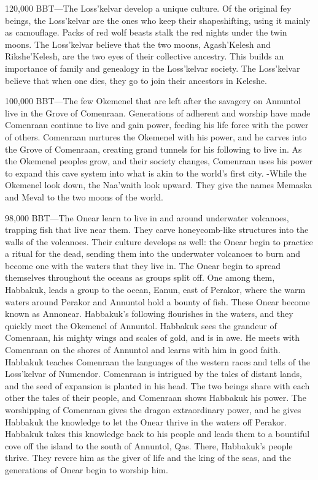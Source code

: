 \documentclass[smalldemyvopaper,11pt,twoside,onecolumn,openright,extrafontsizes]{memoir}
\begin{document}
{{120,000 BBT—The Loss’kelvar develop a unique culture. Of the original fey beings, the Loss’kelvar are the ones who keep their shapeshifting, using it mainly as camouflage. Packs of red wolf beasts stalk the red nights under the twin moons. The Loss’kelvar believe that the two moons, Agash’Kelesh and Rikshe’Kelesh, are the two eyes of their collective ancestry. This builds an importance of family and genealogy in the Loss’kelvar society. The Loss’kelvar believe that when one dies, they go to join their ancestors in Keleshe.

100,000 BBT—The few Okemenel that are left after the savagery on Annuntol live in the Grove of Comenraan. Generations of adherent and worship have made Comenraan continue to live and gain power, feeding his life force with the power of others. Comenraan nurtures the Okemenel with his power, and he carves into the Grove of Comenraan, creating grand tunnels for his following to live in. As the Okemenel peoples grow, and their society changes, Comenraan uses his power to expand this cave system into what is akin to the world’s first city.
-While the Okemenel look down, the Naa’waith look upward. They give the names Memaska and Meval to the two moons of the world.

98,000 BBT—The Onear learn to live in and around underwater volcanoes, trapping fish that live near them. They carve honeycomb-like structures into the walls of the volcanoes. Their culture develops as well: the Onear begin to practice a ritual for the dead, sending them into the underwater volcanoes to burn and become one with the waters that they live in. The Onear begin to spread themselves throughout the oceans as groups split off. One among them, Habbakuk, leads a group to the ocean, Eanun, east of Perakor, where the warm waters around Perakor and Annuntol hold a bounty of fish. These Onear become known as Annonear. Habbakuk’s following flourishes in the waters, and they quickly meet the Okemenel of Annuntol. Habbakuk sees the grandeur of Comenraan, his mighty wings and scales of gold, and is in awe. He meets with Comenraan on the shores of Annuntol and learns with him in good faith. Habbakuk teaches Comenraan the languages of the western races and tells of the Loss’kelvar of Numendor. Comenraan is intrigued by the tales of distant lands, and the seed of expansion is planted in his head. The two beings share with each other the tales of their people, and Comenraan shows Habbakuk his power. The worshipping of Comenraan gives the dragon extraordinary power, and he gives Habbakuk the knowledge to let the Onear thrive in the waters off Perakor. Habbakuk takes this knowledge back to his people and leads them to a bountiful cove off the island to the south of Annuntol, Qas. There, Habbakuk’s people thrive. They revere him as the giver of life and the king of the seas, and the generations of Onear begin to worship him.

}}
\end{document}
